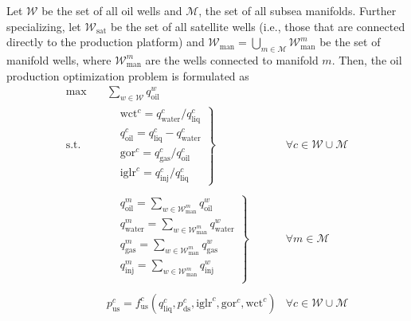\documentclass[pdflatex,sn-mathphys-num]{sn-jnl}%
\newcommand{\new}[1]{#1}
\begin{document}
Let $\mathcal{W}$ be the set of all oil wells and $\mathcal{M}$, the set of all subsea manifolds.
  Further specializing, let $\mathcal{W}_{\text{sat}}$ be the set of all satellite wells (i.e., those that are connected directly to the production platform) and $\mathcal{W}_{\text{man}}= \bigcup_{m \in  \mathcal{M}} \mathcal{W}_{\text{man}}^{m}$ be the set of manifold wells, where $\mathcal{W}_{\text{man}}^{m}$ are the wells connected to manifold $m$.
\new{Then, the oil production optimization problem is formulated as}
\begin{subequations}\label{eq:oil-model}
\begin{align}
    \max \quad & \sum_{w \in \mathcal{W}} q_{\text{oil}}^{w} & \nonumber \\
	\textrm{s.t.} \quad & \left . \begin{aligned} 
        & \text{wct}^{c} = q_{\text{water}}^{c} / q_{\text{liq}}^{c} \\
	& q_{\text{oil}}^{c} = q_{\text{liq}}^{c} - q_{\text{water}}^{c} \\
	& \text{gor}^{c} = q_{\text{gas}}^{c} / q_{\text{oil}}^{c} \\
	& \text{iglr}^{c} = q_{\text{inj}}^{c} / q_{\text{liq}}^{c}
\end{aligned} \right \} & \forall c \in \mathcal{W}\cup \mathcal{M} \label{eq:oil-model-c1} \\
    \nonumber\\
  &  \left .\begin{aligned}
	& q_{\text{oil}}^{m} = \sum_{w \in \mathcal{W}^{m}_{\text{man}}} q_{\text{oil}}^{w} \\
        & q_{\text{water}}^{m} = \sum_{w \in \mathcal{W}^{m}_{\text{man}}} q_{\text{water}}^{w} \\
        & q_{\text{gas}}^{m} = \sum_{w \in \mathcal{W}^{m}_{\text{man}}} q_{\text{gas}}^{w} \\
        & q_{\text{inj}}^{m} = \sum_{w \in \mathcal{W}^{m}_{\text{man}}} q_{\text{inj}}^{w} \\
    \end{aligned} \right \} & \forall m \in \mathcal{M} \label{eq:oil-model-c2} \\
    \nonumber\\
    & p_{\text{us}}^{c} = f_{\text{us}}^{c}(q_{\text{liq}}^{c}, p_{\text{ds}}^{c}, \text{iglr}^{c}, \text{gor}^{c},\text{wct}^{c}) & \forall c \in \mathcal{W}\cup \mathcal{M} \label{eq:oil-model-c4} \\
    \nonumber\\

\end{align}
\end{subequations}
\end{document}
